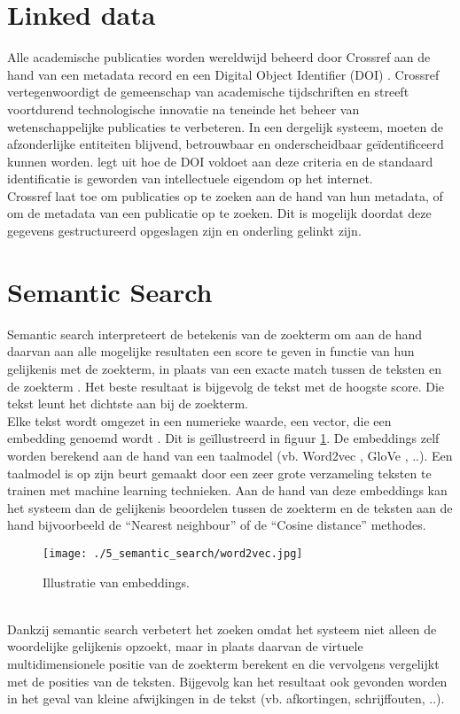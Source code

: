 \section{Linked data}
Alle academische publicaties worden wereldwijd beheerd door Crossref aan de hand van een metadata record en een Digital Object Identifier (DOI) \autocite{Hendricks2020}. Crossref vertegenwoordigt de gemeenschap van academische tijdschriften en streeft voortdurend technologische innovatie na teneinde het beheer van wetenschappelijke publicaties te verbeteren.
In een dergelijk systeem, moeten de afzonderlijke entiteiten blijvend, betrouwbaar en onderscheidbaar geïdentificeerd kunnen worden. \textcite{Chandrakar2006} legt uit hoe de DOI voldoet aan deze criteria en de standaard identificatie is geworden van intellectuele eigendom op het internet.\\
Crossref laat toe om publicaties op te zoeken aan de hand van hun metadata, of om de metadata van een publicatie op te zoeken. Dit is mogelijk doordat deze gegevens gestructureerd opgeslagen zijn en onderling gelinkt zijn.
\section{Semantic Search}
Semantic search interpreteert de betekenis van de zoekterm om aan de hand daarvan aan alle mogelijke resultaten een score te geven in functie van hun gelijkenis met de zoekterm, in plaats van een exacte match tussen de teksten en de zoekterm \autocite{Bast2016}. Het beste resultaat is bijgevolg de tekst met de hoogste score. Die tekst leunt het dichtste aan bij de zoekterm.\\
Elke tekst wordt omgezet in een numerieke waarde, een vector, die een embedding genoemd wordt
\autocite{Almeida2019}. Dit is geïllustreerd in figuur \ref{fig:Word2vec}. De embeddings zelf worden berekend aan de hand van een taalmodel (vb. Word2vec \autocite{Word2vec2025}, GloVe \autocite{Glove2025}, ..). Een taalmodel is op zijn beurt gemaakt door een zeer grote verzameling teksten te trainen met machine learning technieken. Aan de hand van deze embeddings kan het systeem dan de gelijkenis beoordelen tussen de zoekterm en de teksten aan de hand bijvoorbeeld de ``Nearest neighbour'' of de ``Cosine distance'' methodes.
\begin{figure}
    \centering
    \texttt{[image: ./5\_semantic\_search/word2vec.jpg]}
    \caption[Illustratie van embeddings.]{\label{fig:Word2vec}Illustratie van embeddings.}
\end{figure}\\
Dankzij semantic search verbetert het zoeken omdat het systeem niet alleen de woordelijke gelijkenis opzoekt, maar in plaats daarvan de virtuele multidimensionele positie van de zoekterm berekent en die vervolgens vergelijkt met de posities van de teksten. Bijgevolg kan het resultaat ook gevonden worden in het geval van kleine afwijkingen in de tekst (vb. afkortingen, schrijffouten, ..). 




